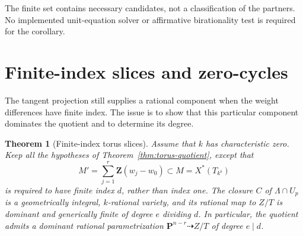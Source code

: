 \documentclass[11pt]{article}
\newtheorem{theorem}{Theorem}[section]
\theoremstyle{remark}
\newcommand{\PP}{\mathbf P}
\newcommand{\Z}{\mathbf Z}
\newcommand{\ks}{k^{\mathrm s}}
\begin{document}
The finite set contains necessary candidates, not a classification of the
partners. No implemented unit-equation solver or affirmative birationality
test is required for the corollary.

\section{Finite-index slices and zero-cycles}
\label{sec:finite-index}

The tangent projection still supplies a rational component when the weight
differences have finite index.  The issue is to show that this particular
component dominates the quotient and to determine its degree.

\begin{theorem}[Finite-index torus slices]
\label{thm:finite-index-slice}
%
%
Assume that \(k\) has characteristic zero.  Keep all the hypotheses of
Theorem~\ref{thm:torus-quotient}, except that
\[
 M'=\sum_{j=1}^r\Z(w_j-w_0)\subset M=X^*(T_{\ks})
\]
is required to have finite index \(d\), rather than index one.
The closure \(C\) of \(\Lambda\cap U_p\) is a geometrically integral,
\(k\)-rational variety, and its rational map to \(Z/T\) is dominant and
generically finite of degree \(e\) dividing \(d\).
In particular, the quotient admits a dominant rational parametrization
\(\PP^{n-r}\dashrightarrow Z/T\) of degree \(e\mid d\).
\end{theorem}
\end{document}
